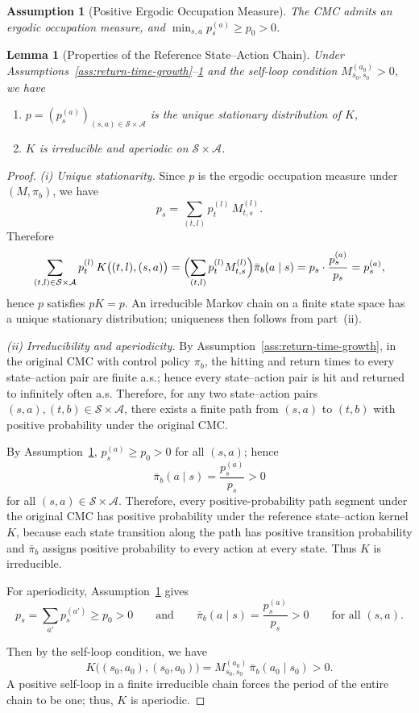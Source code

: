 \documentclass[10pt,a4paper]{amsart}
\newtheorem{assumption}{Assumption}
\newtheorem{lemma}{Lemma}
\begin{document}
\begin{assumption}[Positive Ergodic Occupation Measure]
\label{ass:semi-ergodic}
The CMC admits an ergodic occupation measure, and $\min_{s,a} p_s^{(a)} \ge p_0 > 0$.
\end{assumption}

\begin{lemma}[Properties of the Reference State--Action Chain]
\label{lem:ref-chain}
Under Assumptions~\ref{ass:return-time-growth}--\ref{ass:semi-ergodic} and the self-loop condition $M_{s_0,s_0}^{(a_0)}>0$, we have
\begin{enumerate}
  \item[(i)] $p=(p_s^{(a)})_{(s,a) \in \mathcal S \times \mathcal A}$ is the unique stationary distribution of $K$,
  \item[(ii)] $K$ is irreducible and aperiodic on $\mathcal{S}\times\mathcal{A}$.
\end{enumerate}
\end{lemma}

\begin{proof}
\textit{(i) Unique stationarity.}
Since $p$ is the ergodic occupation measure under $(M,\pi_b)$, we have
\[
p_s = \sum_{(t,l)} p_t^{(l)}\,M_{t,s}^{(l)}.
\]
Therefore
\[
\sum_{(t,l)\in\mathcal{S}\times\mathcal{A}} p_t^{(l)}\,K\bigl((t,l),(s,a)\bigr)
= \Bigl(\sum_{(t,l)} p_t^{(l)} M_{t,s}^{(l)}\Bigr)\bar\pi_b(a\mid s)
= p_s\cdot\frac{p_s^{(a)}}{p_s} = p_s^{(a)},
\]
hence $p$ satisfies $pK=p$. An irreducible Markov chain on a finite state space has a unique stationary distribution; uniqueness then follows from part~(ii).

\textit{(ii) Irreducibility and aperiodicity.}
By Assumption~\ref{ass:return-time-growth}, in the original CMC with
control policy \(\pi_b\), the hitting and return times to every
state--action pair are finite a.s.; hence every state--action pair is hit
and returned to infinitely often a.s. Therefore, for any two
state--action pairs \((s,a),(t,b)\in\mathcal S\times\mathcal A\), there exists a
finite path from \((s,a)\) to \((t,b)\) with positive probability under the
original CMC.

By Assumption~\ref{ass:semi-ergodic}, \(p_s^{(a)}\ge p_0>0\) for all
\((s,a)\); hence
\[
\bar \pi_b(a\mid s)=\frac{p_s^{(a)}}{p_s}>0
\]
for all \((s,a)\in\mathcal S\times\mathcal A\). Therefore, every
positive-probability path segment under the original CMC has positive
probability under the reference state--action kernel \(K\), because each
state transition along the path has positive transition probability and
\(\bar\pi_b\) assigns positive probability to every action at every state.
Thus \(K\) is irreducible.

For aperiodicity, Assumption~\ref{ass:semi-ergodic} gives
\[
p_s = \sum_{a'} p_s^{(a')} \ge p_0 > 0
\qquad\text{and}\qquad
\bar\pi_b(a\mid s) = \frac{p_s^{(a)}}{p_s} > 0
\qquad\text{for all }(s,a).
\]

Then by the self-loop condition, we have
\[
K\bigl((s_0,a_0),(s_0,a_0)\bigr) = M_{s_0,s_0}^{(a_0)}\,\bar\pi_b(a_0\mid s_0) > 0.
\]
A positive self-loop in a finite irreducible chain forces the period of the entire chain to be one; thus, $K$ is aperiodic.
\end{proof}
\end{document}
